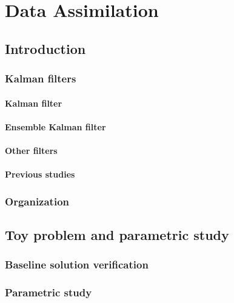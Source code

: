 \addchapheadtotoc
\chapter{Data Assimilation}\label{chapter:dataAssimilation}

\section{Introduction}

\subsection{Kalman filters} 
\subsubsection{Kalman filter}

\subsubsection{Ensemble Kalman filter}

\subsubsection{Other filters}

\subsubsection{Previous studies}

\subsection{Organization}

\section{Toy problem and parametric study} \label{sec:toy_1DProblemDescription}


\subsection{Baseline solution verification} \label{sec:1Dtoy_verifySolnOpenFOAM}

\subsection{Parametric study}\label{sec:enkf_1dParametricStudy}

